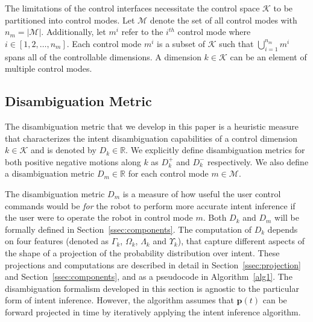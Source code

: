 \documentclass[natbib, twocolumn]{svjour3}          %
\begin{document}
The limitations of the control interfaces necessitate the control space $\mathcal{K}$ to be partitioned into control modes. Let $\mathcal{M}$ denote the set of all control modes with $n_m = \vert\mathcal{M}\vert$. Additionally, let $m^i$ refer to the $i^{th}$ control mode where $i \in [1,2,\dots,n_m]$. Each control mode $m^i$ is a subset of $\mathcal{K}$ such that $\bigcup\limits_{i=1}^{n_m} m^i$ spans all of the controllable dimensions. A dimension $k \in \mathcal{K}$ can be an element of multiple control modes.


\subsection{Disambiguation Metric}\label{ssec:disamb}
The disambiguation metric that we develop in this paper is a heuristic measure that characterizes the intent disambiguation capabilities of a control dimension $k \in \mathcal{K}$ and is denoted by $D_k \in \mathbb{R}$. We explicitly define disambiguation metrics for both positive negative motions along $k$ as $D_k^{+}$ and $D_k^{-}$ respectively. We also define a disambiguation metric $D_m \in \mathbb{R}$ for each control mode $m \in \mathcal{M}$.

The disambiguation metric $D_m$ is a measure of how useful the user control commands would be \textit{for} the robot to perform more accurate intent inference if the user were to operate the robot in control mode $m$. Both $D_k$ and $D_m$ will be formally defined in Section~\ref{ssec:components}.
The computation of $D_k$ depends on four features (denoted as $\Gamma_k$, $\Omega_k$, $\Lambda_k$ and $\Upsilon_k$), that capture different aspects of the shape of a projection of the probability distribution over intent. These projections and computations are described in detail in Section~\ref{ssec:projection} and Section~\ref{ssec:components}, and as a pseudocode in Algorithm~\ref{alg1}. The disambiguation formalism developed in this section is agnostic to the particular form of intent inference. However, the algorithm assumes that $\boldsymbol{p}(t)$ can be forward projected in time by iteratively applying the intent inference algorithm. 
\end{document}
